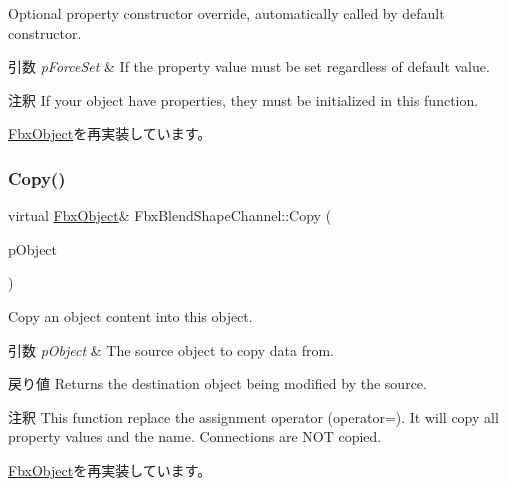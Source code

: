 Optional property constructor override, automatically called by default constructor. 
\begin{DoxyParams}{引数}
{\em p\+Force\+Set} & If the property value must be set regardless of default value. \\
\hline
\end{DoxyParams}
\begin{DoxyRemark}{注釈}
If your object have properties, they must be initialized in this function. 
\end{DoxyRemark}


\hyperlink{class_fbx_object_ad44f814323dc1b5e78bff1bfc608b4bb}{Fbx\+Object}を再実装しています。

\mbox{\label{class_fbx_blend_shape_channel_a7bf3a456eafada45fa2e934f15422026}} 
\subsubsection{\texorpdfstring{Copy()}{Copy()}}
{\footnotesize\ttfamily virtual \hyperlink{class_fbx_object}{Fbx\+Object}\& Fbx\+Blend\+Shape\+Channel\+::\+Copy (\begin{DoxyParamCaption}\item[{const \hyperlink{class_fbx_object}{Fbx\+Object} \&}]{p\+Object }\end{DoxyParamCaption})\hspace{0.3cm}{\ttfamily [virtual]}}

Copy an object content into this object. 
\begin{DoxyParams}{引数}
{\em p\+Object} & The source object to copy data from. \\
\hline
\end{DoxyParams}
\begin{DoxyReturn}{戻り値}
Returns the destination object being modified by the source. 
\end{DoxyReturn}
\begin{DoxyRemark}{注釈}
This function replace the assignment operator (operator=). It will copy all property values and the name. Connections are N\+OT copied. 
\end{DoxyRemark}


\hyperlink{class_fbx_object_a0c0c5adb38284d14bb82c04d54504a3e}{Fbx\+Object}を再実装しています。

